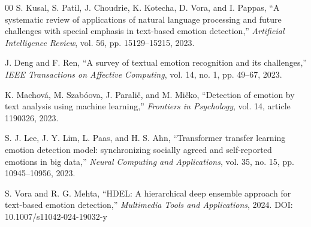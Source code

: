 \documentclass[conference]{IEEEtran}
\begin{document}
\begin{thebibliography}{00}
 S. Kusal, S. Patil, J. Choudrie, K. Kotecha, D. Vora, and I. Pappas, ``A systematic review of applications of natural language processing and future challenges with special emphasis in text-based emotion detection,'' \textit{Artificial Intelligence Review}, vol. 56, pp. 15129--15215, 2023.

 J. Deng and F. Ren, ``A survey of textual emotion recognition and its challenges,'' \textit{IEEE Transactions on Affective Computing}, vol. 14, no. 1, pp. 49--67, 2023.

 K. Machová, M. Szabóova, J. Paralič, and M. Mičko, ``Detection of emotion by text analysis using machine learning,'' \textit{Frontiers in Psychology}, vol. 14, article 1190326, 2023.

 S. J. Lee, J. Y. Lim, L. Paas, and H. S. Ahn, ``Transformer transfer learning emotion detection model: synchronizing socially agreed and self-reported emotions in big data,'' \textit{Neural Computing and Applications}, vol. 35, no. 15, pp. 10945--10956, 2023.

 S. Vora and R. G. Mehta, ``HDEL: A hierarchical deep ensemble approach for text-based emotion detection,'' \textit{Multimedia Tools and Applications}, 2024. DOI: 10.1007/s11042-024-19032-y

\end{thebibliography}
\end{document}
